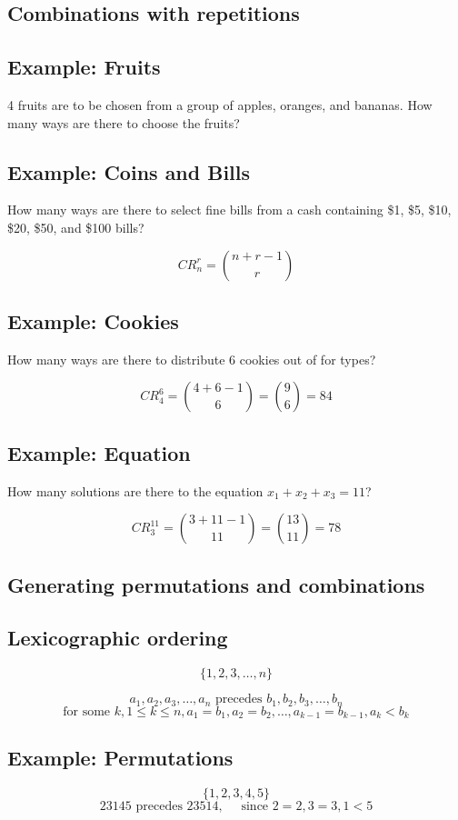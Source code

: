 \documentclass[11pt]{article}
\begin{document}
\subsection{Combinations with repetitions}

\subsection*{Example: Fruits}
4 fruits are to be chosen from a group of apples, oranges, and bananas. How many ways are there to choose the fruits?

\subsection*{Example: Coins and Bills}
How many ways are there to select fine bills from a cash containing \$1, \$5, \$10, \$20, \$50, and \$100 bills?

\[
CR_n^r = \binom{n + r - 1}{r}
\]

\subsection*{Example: Cookies}
How many ways are there to distribute 6 cookies out of for types?

\[
CR_4^6 = \binom{4 + 6 - 1}{6} = \binom{9}{6} = 84
\]

\subsection*{Example: Equation}
How many solutions are there to the equation $x_1 + x_2 + x_3 = 11$?

\[
CR_3^{11} = \binom{3 + 11 - 1}{11} = \binom{13}{11} = 78
\]

\subsection{Generating permutations and combinations}
\subsection*{Lexicographic ordering}
\[
\{1,2,3, \dots , n\}
\]

\[
a_1, a_2, a_3, \dots,  a_n \text{ precedes } b_1, b_2, b_3, \dots, b_n 
\]
\[
\text{for some } k, 1 \leq k \leq n, a_1 = b_1, a_2 = b_2, \dots, a_{k-1} = b_{k-1}, a_k < b_k
\]

\subsection*{Example: Permutations}
\[
\{1, 2, 3, 4, 5\}
\]
\[
23145 \text{ precedes } 23514, \quad \text{  since } 2 = 2, 3 = 3, 1 < 5
\]
\end{document}
